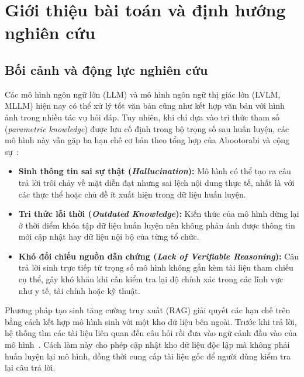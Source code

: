 
\chapter{Giới thiệu bài toán và định hướng nghiên cứu}
\label{chap:intro}

\section{Bối cảnh và động lực nghiên cứu}
\label{sec:intro_context}

Các mô hình ngôn ngữ lớn (LLM) và mô hình ngôn ngữ thị giác lớn (LVLM, MLLM) hiện nay có thể xử lý tốt văn bản cũng như kết hợp văn bản với hình ảnh trong nhiều tác vụ hỏi đáp. Tuy nhiên, khi chỉ dựa vào tri thức tham số (\textit{parametric knowledge}) được lưu cố định trong bộ trọng số sau huấn luyện, các mô hình này vẫn gặp ba hạn chế cơ bản theo tổng hợp của Abootorabi và cộng sự~\cite{abootorabi2025ask}:
\begin{itemize}
    \item \textbf{Sinh thông tin sai sự thật (\textit{Hallucination}):} Mô hình có thể tạo ra câu trả lời trôi chảy về mặt diễn đạt nhưng sai lệch nội dung thực tế, nhất là với các thực thể hoặc chủ đề ít xuất hiện trong dữ liệu huấn luyện.
    \item \textbf{Tri thức lỗi thời (\textit{Outdated Knowledge}):} Kiến thức của mô hình dừng lại ở thời điểm khóa tập dữ liệu huấn luyện nên không phản ánh được thông tin mới cập nhật hay dữ liệu nội bộ của từng tổ chức.
    \item \textbf{Khó đối chiếu nguồn dẫn chứng (\textit{Lack of Verifiable Reasoning}):} Câu trả lời sinh trực tiếp từ trọng số mô hình không gắn kèm tài liệu tham chiếu cụ thể, gây khó khăn khi cần kiểm tra lại độ chính xác trong các lĩnh vực như y tế, tài chính hoặc kỹ thuật.
\end{itemize}

Phương pháp tạo sinh tăng cường truy xuất (RAG) giải quyết các hạn chế trên bằng cách kết hợp mô hình sinh với một kho dữ liệu bên ngoài. Trước khi trả lời, hệ thống tìm các tài liệu liên quan đến câu hỏi rồi đưa vào ngữ cảnh đầu vào của mô hình~\cite{abootorabi2025ask}. Cách làm này cho phép cập nhật kho dữ liệu độc lập mà không phải huấn luyện lại mô hình, đồng thời cung cấp tài liệu gốc để người dùng kiểm tra lại câu trả lời.

